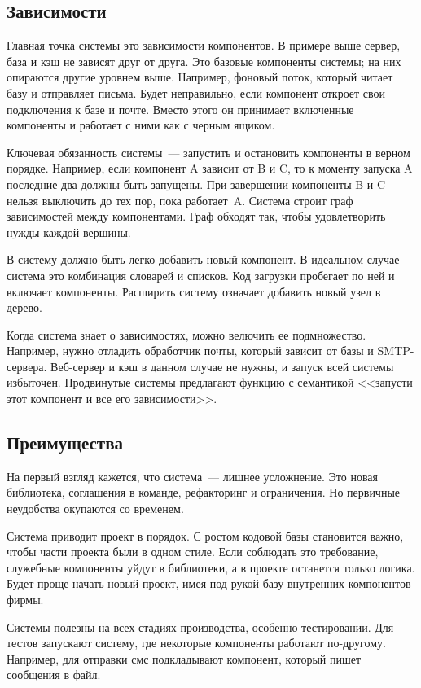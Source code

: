 \subsection{Зависимости}

Главная точка системы это зависимости компонентов. В примере выше сервер, база и
кэш не зависят друг от друга. Это базовые компоненты системы; на них опираются
другие уровнем выше. Например, фоновый поток, который читает базу и отправляет
письма. Будет неправильно, если компонент откроет свои подключения к базе и
почте. Вместо этого он принимает включенные компоненты и работает с ними как с
черным ящиком.

Ключевая обязанность системы~--- запустить и остановить компоненты в верном
порядке. Например, если компонент A зависит от B и C, то к моменту запуска A
последние два должны быть запущены. При завершении компоненты B и C нельзя
выключить до тех пор, пока работает~A. Система строит граф зависимостей между
компонентами. Граф обходят так, чтобы удовлетворить нужды каждой вершины.

В систему должно быть легко добавить новый компонент. В идеальном случае система
это комбинация словарей и списков. Код загрузки пробегает по ней и включает
компоненты. Расширить систему означает добавить новый узел в дерево.

Когда система знает о зависимостях, можно велючить ее подмножество. Например,
нужно отладить обработчик почты, который зависит от базы и
SMTP-сервера. Веб-сервер и кэш в данном случае не нужны, и запуск всей системы
избыточен. Продвинутые системы предлагают функцию с семантикой <<запусти этот
компонент и все его зависимости>>.

\subsection{Преимущества}

На первый взгляд кажется, что система~--- лишнее усложнение. Это новая
библиотека, соглашения в команде, рефакторинг и ограничения. Но первичные
неудобства окупаются со временем.

Система приводит проект в порядок. С ростом кодовой базы становится важно, чтобы
части проекта были в одном стиле. Если соблюдать это требование, служебные
компоненты уйдут в библиотеки, а в проекте останется только логика. Будет проще
начать новый проект, имея под рукой базу внутренних компонентов фирмы.

Системы полезны на всех стадиях производства, особенно тестировании. Для тестов
запускают систему, где некоторые компоненты работают по-другому. Например, для
отправки смс подкладывают компонент, который пишет сообщения в файл.

